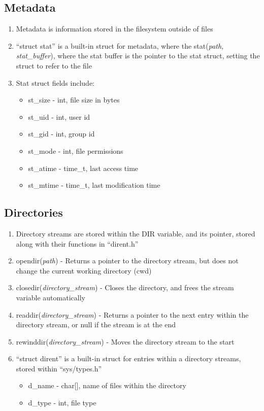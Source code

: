 \documentclass[11 pt, twoside]{article}
\begin{document}
\subsection{Metadata}
\begin{enumerate}
\item Metadata is information stored in the filesystem outside of files
\item ``struct stat'' is a built-in struct for metadata, where the stat(\textit{path, stat\_buffer}), where the stat buffer is the pointer to the stat struct, setting the struct to refer to the file
\item Stat struct fields include:
\begin{itemize}
\item st\_size - int, file size in bytes
\item st\_uid - int, user id
\item st\_gid - int, group id
\item st\_mode - int, file permissions
\item st\_atime - time\_t, last access time
\item st\_mtime - time\_t, last modification time
\end{itemize}
\end{enumerate}

\subsection{Directories}
\begin{enumerate}
\item Directory streams are stored within the DIR variable, and its pointer, stored along with their functions in ``dirent.h''
\item opendir(\textit{path}) - Returns a pointer to the directory stream, but does not change the current working directory (cwd)
\item closedir(\textit{directory\_stream}) - Closes the directory, and frees the stream variable automatically
\item readdir(\textit{directory\_stream}) - Returns a pointer to the next entry within the directory stream, or null if the stream is at the end
\item rewinddir(\textit{directory\_stream}) - Moves the directory stream to the start
\item ``struct dirent'' is a built-in struct for entries within a directory streams, stored within ``sys/types.h''
\begin{itemize}
\item d\_name - char[], name of files within the directory
\item d\_type - int, file type
\end{itemize}
\end{enumerate}
\end{document}
